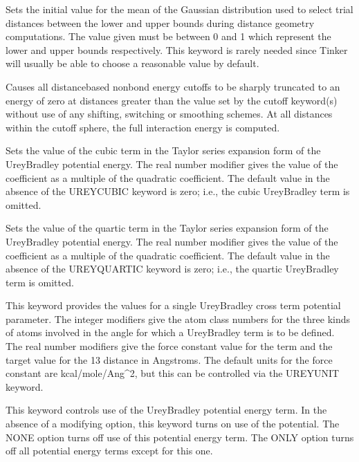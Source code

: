 \documentclass[letterpaper,11pt,english]{sphinxmanual}
\begin{document}
  Sets the initial value for the mean of the Gaussian distribution used to select trial distances between the lower and upper bounds during distance geometry computations. The value given must be between 0 and 1 which represent the lower and upper bounds respectively. This keyword is rarely needed since Tinker will usually be able to choose a reasonable value by default.

  Causes all distance\sphinxhyphen{}based nonbond energy cutoffs to be sharply truncated to an energy of zero at distances greater than the value set by the cutoff keyword(s) without use of any shifting, switching or smoothing schemes. At all distances within the cutoff sphere, the full interaction energy is computed.

  Sets the value of the cubic term in the Taylor series expansion form of the Urey\sphinxhyphen{}Bradley potential energy. The real number modifier gives the value of the coefficient as a multiple of the quadratic coefficient. The default value in the absence of the UREY\sphinxhyphen{}CUBIC keyword is zero; i.e., the cubic Urey\sphinxhyphen{}Bradley term is omitted.

  Sets the value of the quartic term in the Taylor series expansion form of the Urey\sphinxhyphen{}Bradley potential energy. The real number modifier gives the value of the coefficient as a multiple of the quadratic coefficient. The default value in the absence of the UREY\sphinxhyphen{}QUARTIC keyword is zero; i.e., the quartic Urey\sphinxhyphen{}Bradley term is omitted.

  This keyword provides the values for a single Urey\sphinxhyphen{}Bradley cross term potential parameter. The integer modifiers give the atom class numbers for the three kinds of atoms involved in the angle for which a Urey\sphinxhyphen{}Bradley term is to be defined. The real number modifiers give the force constant value for the term and the target value for the 1\sphinxhyphen{}3 distance in Angstroms. The default units for the force constant are kcal/mole/Ang\textasciicircum{}2, but this can be controlled via the UREYUNIT keyword.

  This keyword controls use of the Urey\sphinxhyphen{}Bradley potential energy term. In the absence of a modifying option, this keyword turns on use of the potential. The NONE option turns off use of this potential energy term. The ONLY option turns off all potential energy terms except for this one.
\end{document}
